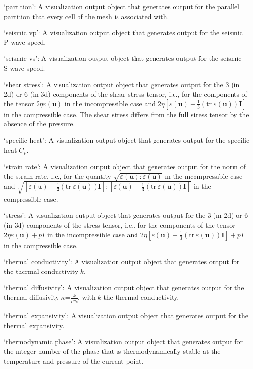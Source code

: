 \begin{itemize}
`partition': A visualization output object that generates output for the parallel partition that every cell of the mesh is associated with.

`seismic vp': A visualization output object that generates output for the seismic P-wave speed.

`seismic vs': A visualization output object that generates output for the seismic S-wave speed.

`shear stress': A visualization output object that generates output for the 3 (in 2d) or 6 (in 3d) components of the shear stress tensor, i.e., for the components of the tensor $2\eta\varepsilon(\mathbf u)$ in the incompressible case and $2\eta\left[\varepsilon(\mathbf u)-\tfrac 13(\textrm{tr}\;\varepsilon(\mathbf u))\mathbf I\right]$ in the compressible case. The shear stress differs from the full stress tensor by the absence of the pressure.

`specific heat': A visualization output object that generates output for the specific heat $C_p$.

`strain rate': A visualization output object that generates output for the norm of the strain rate, i.e., for the quantity $\sqrt{\varepsilon(\mathbf u):\varepsilon(\mathbf u)}$ in the incompressible case and $\sqrt{[\varepsilon(\mathbf u)-\tfrac 13(\textrm{tr}\;\varepsilon(\mathbf u))\mathbf I]:[\varepsilon(\mathbf u)-\tfrac 13(\textrm{tr}\;\varepsilon(\mathbf u))\mathbf I]}$ in the compressible case.

`stress': A visualization output object that generates output for the 3 (in 2d) or 6 (in 3d) components of the stress tensor, i.e., for the components of the tensor $2\eta\varepsilon(\mathbf u)+pI$ in the incompressible case and $2\eta\left[\varepsilon(\mathbf u)-\tfrac 13(\textrm{tr}\;\varepsilon(\mathbf u))\mathbf I\right]+pI$ in the compressible case.

`thermal conductivity': A visualization output object that generates output for the thermal conductivity $k$.

`thermal diffusivity': A visualization output object that generates output for the thermal diffusivity $\kappa$=$\frac{k}{\rho c_p}$, with $k$ the thermal conductivity.

`thermal expansivity': A visualization output object that generates output for the thermal expansivity.

`thermodynamic phase': A visualization output object that generates output for the integer number of the phase that is thermodynamically stable at the temperature and pressure of the current point.


\end{itemize}
